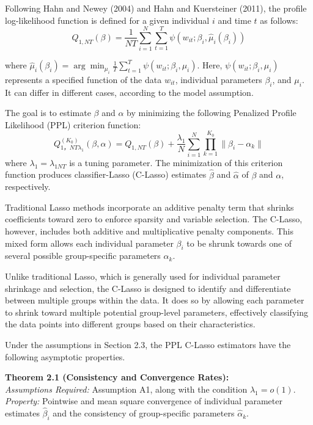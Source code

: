 \documentclass[UTF8,a4paper,10pt]{article}
\begin{document}
Following Hahn and Newey (2004) and Hahn and Kuersteiner (2011), the profile log-likelihood function is defined for a given individual $i$ and time $t$ as follows:
\[
Q_{1,NT}(\beta) = \frac{1}{NT} \sum_{i=1}^{N} \sum_{t=1}^{T} \psi(w_{it}; \beta_i, \hat{\mu}_i(\beta_i))
\]

where $\hat{\mu}_i(\beta_i) = \arg\min_{\mu_i} \frac{1}{T} \sum_{t=1}^{T} \psi(w_{it}; \beta_i, \mu_i)$. Here, $\psi(w_{it}; \beta_i, \mu_i)$ represents a specified function of the data $w_{it}$, individual parameters $\beta_i$, and $\mu_i$. It can differ in different cases, according to the model assumption.

The goal is to estimate $\beta$ and $\alpha$ by minimizing the following Penalized Profile Likelihood (PPL) criterion function:
\[
Q^{(K_0)}_{1，{NT} \lambda_1} (\beta, \alpha) =Q_{1,NT}(\beta) + \frac{\lambda_1}{N} \sum_{i=1}^{N} \prod_{k=1}^{K_0} \| \beta_i - \alpha_k \|
\]
where $\lambda_1 = \lambda_{1NT}$ is a tuning parameter. The minimization of this criterion function produces classifier-Lasso (C-Lasso) estimates $\hat{\beta}$ and $\hat{\alpha}$ of $\beta$ and $\alpha$, respectively.

Traditional Lasso methods incorporate an additive penalty term that shrinks coefficients toward zero to enforce sparsity and variable selection. 
The C-Lasso, however, includes both additive and multiplicative penalty components. This mixed form allows each individual parameter $\beta_i$ to be shrunk towards one of several possible group-specific parameters $\alpha_k$.

Unlike traditional Lasso, which is generally used for individual parameter shrinkage and selection, the C-Lasso is designed to identify and differentiate between multiple groups within the data. It does so by allowing each parameter to shrink toward multiple potential group-level parameters, effectively classifying the data points into different groups based on their characteristics. 


Under the assumptions in Section 2.3, the PPL C-Lasso estimators have the following asymptotic properties.


\textbf{Theorem 2.1 (Consistency and Convergence Rates):}\\
\textit{Assumptions Required:}  Assumption A1, along with the condition \(\lambda_1 = o(1)\).\\
\textit{Property:} Pointwise and mean square convergence of individual parameter estimates \(\hat{\beta}_i\) and the consistency of group-specific parameters \(\hat{\alpha}_k\).
\end{document}
